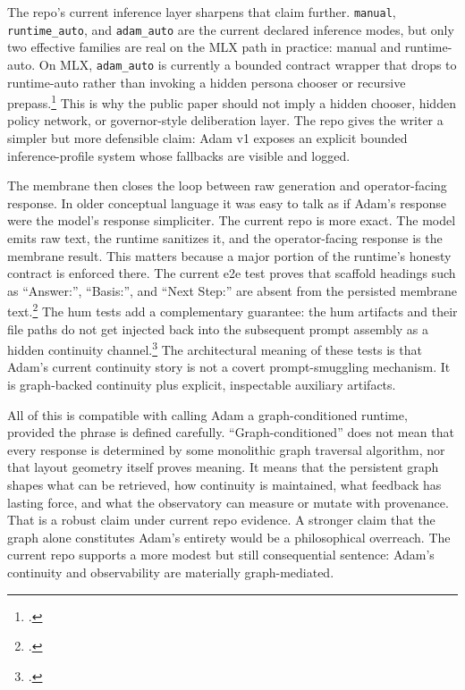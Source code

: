 \documentclass[10pt]{article}
\begin{document}
The repo's current inference layer sharpens that claim further. \texttt{manual}, \texttt{runtime\_auto}, and \texttt{adam\_auto} are the current declared inference modes, but only two effective families are real on the MLX path in practice: manual and runtime-auto. On MLX, \texttt{adam\_auto} is currently a bounded contract wrapper that drops to runtime-auto rather than invoking a hidden persona chooser or recursive prepass.\footnote{.} This is why the public paper should not imply a hidden chooser, hidden policy network, or governor-style deliberation layer. The repo gives the writer a simpler but more defensible claim: Adam v1 exposes an explicit bounded inference-profile system whose fallbacks are visible and logged.

The membrane then closes the loop between raw generation and operator-facing response. In older conceptual language it was easy to talk as if Adam's response were the model's response simpliciter. The current repo is more exact. The model emits raw text, the runtime sanitizes it, and the operator-facing response is the membrane result. This matters because a major portion of the runtime's honesty contract is enforced there. The current e2e test proves that scaffold headings such as ``Answer:'', ``Basis:'', and ``Next Step:'' are absent from the persisted membrane text.\footnote{.} The hum tests add a complementary guarantee: the hum artifacts and their file paths do not get injected back into the subsequent prompt assembly as a hidden continuity channel.\footnote{.} The architectural meaning of these tests is that Adam's current continuity story is not a covert prompt-smuggling mechanism. It is graph-backed continuity plus explicit, inspectable auxiliary artifacts.

All of this is compatible with calling Adam a graph-conditioned runtime, provided the phrase is defined carefully. ``Graph-conditioned'' does not mean that every response is determined by some monolithic graph traversal algorithm, nor that layout geometry itself proves meaning. It means that the persistent graph shapes what can be retrieved, how continuity is maintained, what feedback has lasting force, and what the observatory can measure or mutate with provenance. That is a robust claim under current repo evidence. A stronger claim that the graph alone constitutes Adam's entirety would be a philosophical overreach. The current repo supports a more modest but still consequential sentence: Adam's continuity and observability are materially graph-mediated.
\end{document}

